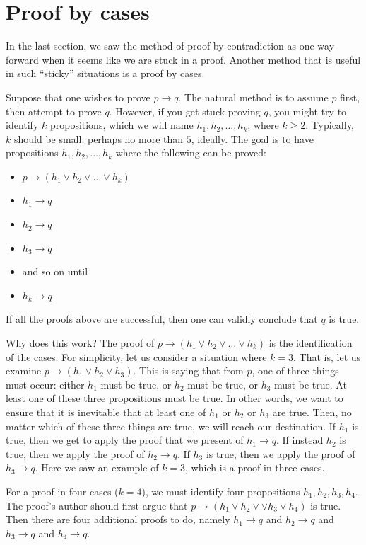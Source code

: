 \documentclass{book}
\theoremstyle{ekimcustom}
\begin{document}
\section{Proof by cases}\label{section:proof-by-cases}

In the last section, we saw the method of proof by contradiction as one way forward when it seems like we are stuck in a proof. Another method that is useful in such ``sticky'' situations is a proof by cases.

Suppose that one wishes to prove $p \rightarrow q$. The natural method is to assume $p$ first, then attempt to prove $q$. However, if you get stuck proving $q$, you might try to identify $k$ propositions, which we will name $h_1,h_2,\dots,h_k$, where $k \geq 2$. Typically, $k$ should be small: perhaps no more than $5$, ideally. The goal is to have propositions  $h_1,h_2,\dots,h_k$ where the following can be proved:
\begin{itemize}
\item $p \rightarrow (h_1 \vee h_2 \vee \dots \vee h_k)$
\item $h_1 \rightarrow q$
\item $h_2 \rightarrow q$
\item $h_3 \rightarrow q$
\item and so on until
\item $h_k \rightarrow q$
\end{itemize}
If all the proofs above are successful, then one can validly conclude that $q$ is true.

Why does this work? The proof of $p \rightarrow (h_1 \vee h_2 \vee \dots \vee h_k)$ is the identification of the cases. For simplicity, let us consider a situation where $k=3$. That is, let us examine $p \rightarrow (h_1 \vee h_2 \vee h_3)$. This is saying that from $p$, one of three things must occur: either $h_1$ must be true, or $h_2$ must be true, or $h_3$ must be true. At least one of these three propositions must be true. In other words, we want to ensure that it is inevitable that at least one of $h_1$ or $h_2$ or $h_3$ are true. Then, no matter which of these three things are true, we will reach our destination. If $h_1$ is true, then we get to apply the proof that we present of $h_1 \rightarrow q$. If instead $h_2$ is true, then we apply the proof of $h_2 \rightarrow q$. If $h_3$ is true, then we apply the proof of $h_3 \rightarrow q$. Here we saw an example of $k=3$, which is a proof in three cases.

For a proof in four cases ($k=4$), we must identify four propositions $h_1,h_2,h_3,h_4$. The proof's author should first argue that $p \rightarrow (h_1 \vee h_2 \vee \vee h_3 \vee h_4)$ is true. Then there are four additional proofs to do, namely $h_1 \rightarrow q$ and $h_2 \rightarrow q$ and $h_3 \rightarrow q$ and $h_4 \rightarrow q$.
\end{document}

